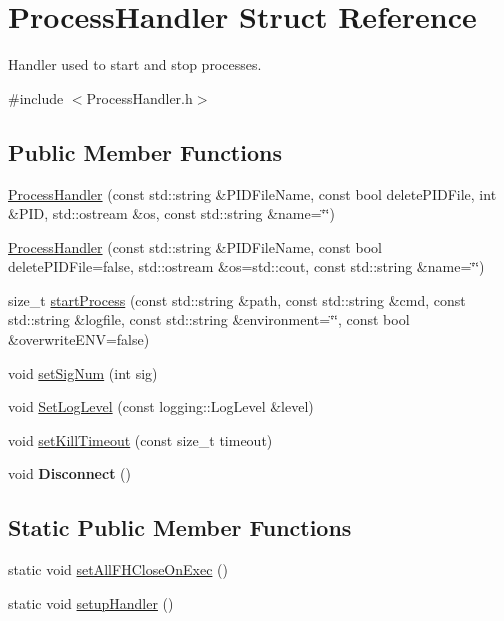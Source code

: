 \hypertarget{structProcessHandler}{}\section{Process\+Handler Struct Reference}
\label{structProcessHandler}


Handler used to start and stop processes.  




{\ttfamily \#include $<$Process\+Handler.\+h$>$}

\subsection*{Public Member Functions}
\begin{DoxyCompactItemize}
\item 
\hyperlink{structProcessHandler_a8b3e2bdfd035834b7f1f24448612634e}{Process\+Handler} (const std\+::string \&P\+I\+D\+File\+Name, const bool delete\+P\+I\+D\+File, int \&P\+ID, std\+::ostream \&os, const std\+::string \&name=\char`\"{}\char`\"{})
\item 
\hyperlink{structProcessHandler_a7eae2717540d1d2da5218998a00a44ec}{Process\+Handler} (const std\+::string \&P\+I\+D\+File\+Name, const bool delete\+P\+I\+D\+File=false, std\+::ostream \&os=std\+::cout, const std\+::string \&name=\char`\"{}\char`\"{})
\item 
size\+\_\+t \hyperlink{structProcessHandler_a9102d9895d68907414a97d4cd4ed79cc}{start\+Process} (const std\+::string \&path, const std\+::string \&cmd, const std\+::string \&logfile, const std\+::string \&environment=\char`\"{}\char`\"{}, const bool \&overwrite\+E\+NV=false)
\item 
void \hyperlink{structProcessHandler_a19a0020ef87b7e09c84c112a944016f6}{set\+Sig\+Num} (int sig)
\item 
void \hyperlink{structProcessHandler_a0db436c44ab9d066f8ad4f925d69ab45}{Set\+Log\+Level} (const logging\+::\+Log\+Level \&level)
\item 
void \hyperlink{structProcessHandler_a891de9a49ab67efc84b5644abec67617}{set\+Kill\+Timeout} (const size\+\_\+t timeout)
\item 
void {\bfseries Disconnect} ()\hypertarget{structProcessHandler_ace0b788dd6e9dfcc29cb4ecb085e2b5e}{}\label{structProcessHandler_ace0b788dd6e9dfcc29cb4ecb085e2b5e}

\end{DoxyCompactItemize}
\subsection*{Static Public Member Functions}
\begin{DoxyCompactItemize}
\item 
static void \hyperlink{structProcessHandler_ab21685e016fc2f3365665640261e939c}{set\+All\+F\+H\+Close\+On\+Exec} ()
\item 
static void \hyperlink{structProcessHandler_a4eb6afb25ee59bf5e015c465b71c40c2}{setup\+Handler} ()
\end{DoxyCompactItemize}


